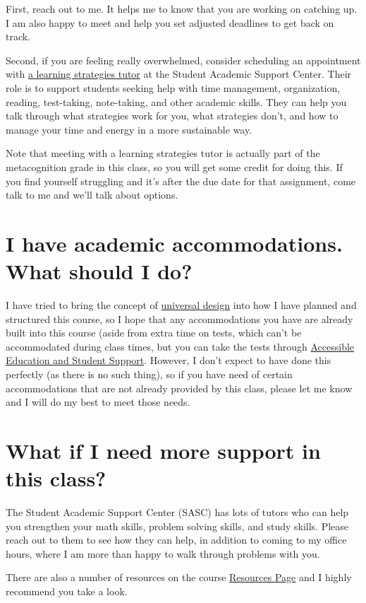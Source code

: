 \documentclass[
  letterpaper,
  DIV=11,
  numbers=noendperiod]{scrartcl}
\begin{document}
First, reach out to me. It helps me to know that you are working on
catching up. I am also happy to meet and help you set adjusted deadlines
to get back on track.

Second, if you are feeling really overwhelmed, consider scheduling an
appointment with
\href{https://www.bates.edu/student-academic-support-center/learning-strategies/}{a
learning strategies tutor} at the Student Academic Support Center. Their
role is to support students seeking help with time management,
organization, reading, test-taking, note-taking, and other academic
skills. They can help you talk through what strategies work for you,
what strategies don't, and how to manage your time and energy in a more
sustainable way.

Note that meeting with a learning strategies tutor is actually part of
the metacognition grade in this class, so you will get some credit for
doing this. If you find yourself struggling and it's after the due date
for that assignment, come talk to me and we'll talk about options.

\section{I have academic accommodations. What should I
do?}\label{accommodations}

I have tried to bring the concept of
\href{https://www.washington.edu/doit/what-universal-design-0}{universal
design} into how I have planned and structured this course, so I hope
that any accommodations you have are already built into this course
(aside from extra time on tests, which can't be accommodated during
class times, but you can take the tests through
\href{https://www.bates.edu/accessible-education-student-support/requesting-services/how-to-register-for-accommodations/}{Accessible
Education and Student Support}. However, I don't expect to have done
this perfectly (as there is no such thing), so if you have need of
certain accommodations that are not already provided by this class,
please let me know and I will do my best to meet those needs.

\section{What if I need more support in this class?}\label{extrahelp}

The Student Academic Support Center (SASC) has lots of tutors who can
help you strengthen your math skills, problem solving skills, and study
skills. Please reach out to them to see how they can help, in addition
to coming to my office hours, where I am more than happy to walk through
problems with you.

There are also a number of resources on the course
\href{resources.qmd}{Resources Page} and I highly recommend you take a
look.
\end{document}
